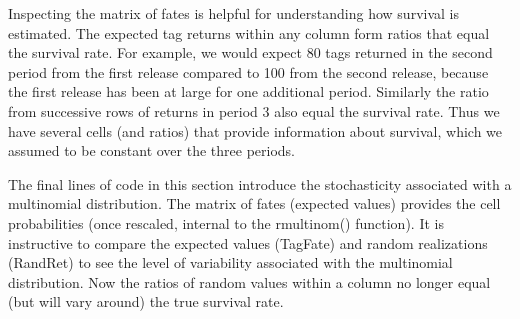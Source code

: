 \documentclass[
]{krantz}
\begin{document}
Inspecting the matrix of fates is helpful for understanding how survival is estimated. The expected tag returns within any column form ratios that equal the survival rate. For example, we would expect 80 tags returned in the second period from the first release compared to 100 from the second release, because the first release has been at large for one additional period. Similarly the ratio from successive rows of returns in period 3 also equal the survival rate. Thus we have several cells (and ratios) that provide information about survival, which we assumed to be constant over the three periods.

The final lines of code in this section introduce the stochasticity associated with a multinomial distribution. The matrix of fates (expected values) provides the cell probabilities (once rescaled, internal to the rmultinom() function). It is instructive to compare the expected values (TagFate) and random realizations (RandRet) to see the level of variability associated with the multinomial distribution. Now the ratios of random values within a column no longer equal (but will vary around) the true survival rate.
\end{document}
